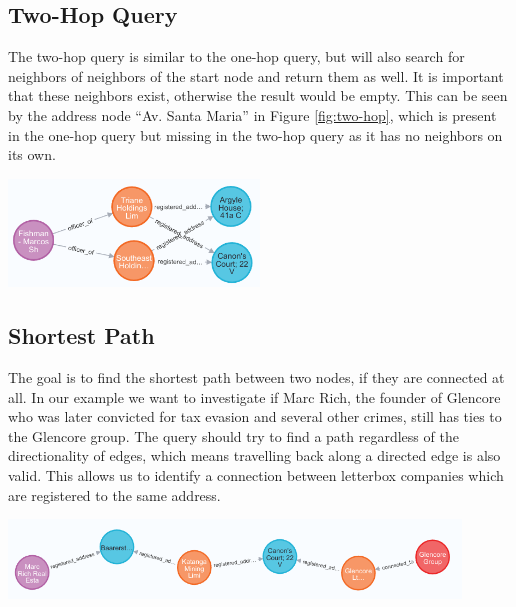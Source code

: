 \documentclass[11pt, a4paper,oneside,chapterprefix=false]{scrbook}
\begin{document}
\subsection{Two-Hop Query}

The two-hop query is similar to the one-hop query, but will also search for neighbors of neighbors of the start node and return them as well. 
It is important that these neighbors exist, otherwise the result would be empty.
This can be seen by the address node ``Av. Santa Maria'' in Figure \ref{fig:two-hop}, which is present in the one-hop query but missing in the two-hop query as it has no neighbors on its own.

\begin{center}
\includegraphics*[width=0.5\textwidth]{figures/query-two-hop.png}
\end{center}

\subsection{Shortest Path}

The goal is to find the shortest path between two nodes, if they are connected at all. In our example we want to investigate if Marc Rich, the founder of Glencore who was later convicted for tax evasion and several other crimes, still has ties to the Glencore group.
The query should try to find a path regardless of the directionality of edges, which means travelling back along a directed edge is also valid.
This allows us to identify a connection between letterbox companies which are registered to the same address.

\begin{center}
\includegraphics*[width=0.9\textwidth]{figures/query-shortest-path-2.png}
\end{center}
\end{document}

